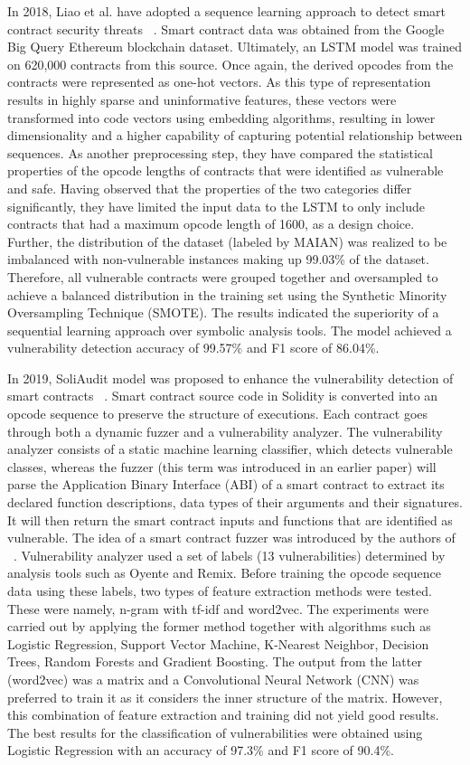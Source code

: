 In 2018, Liao et al. have adopted a sequence learning approach to detect smart contract security threats ~\cite{madmax}.
Smart contract data was obtained from the Google Big Query Ethereum blockchain dataset.
Ultimately, an LSTM model was trained on 620,000 contracts from this source. Once again, the derived opcodes from the contracts were represented as one-hot vectors.
As this type of representation results in highly sparse and uninformative features, these vectors were transformed into code vectors using embedding algorithms, resulting in lower dimensionality and a higher capability of capturing potential relationship between sequences.
As another preprocessing step, they have compared the statistical properties of the opcode lengths of contracts that were identified as vulnerable and safe.
Having observed that the properties of the two categories differ significantly, they have limited the input data to the LSTM to only include contracts that had a maximum opcode length of 1600, as a design choice.
Further, the distribution of the dataset (labeled by MAIAN) was realized to be imbalanced with non-vulnerable instances making up 99.03\% of the dataset.
Therefore, all vulnerable contracts were grouped together and oversampled to achieve a balanced distribution in the training set using the Synthetic Minority Oversampling Technique (SMOTE).
The results indicated the superiority of a sequential learning approach over symbolic analysis tools.
The model achieved a vulnerability detection accuracy of 99.57\% and F1 score of 86.04\%.

In 2019, SoliAudit model was proposed to enhance the vulnerability detection of smart contracts ~\cite{etehrTrust}.
Smart contract source code in Solidity is converted into an opcode sequence to preserve the structure of executions.
Each contract goes through both a dynamic fuzzer and a vulnerability analyzer.
The vulnerability analyzer consists of a static machine learning classifier, which detects vulnerable classes, whereas the fuzzer (this term was introduced in an earlier paper) will parse the Application Binary Interface (ABI) of a smart contract to extract its declared function descriptions, data types of their arguments and their signatures.
It will then return the smart contract inputs and functions that are identified as vulnerable.
The idea of a smart contract fuzzer was introduced by the authors of ~\cite{etehrTrust}.
Vulnerability analyzer used a set of labels (13 vulnerabilities) determined by analysis tools such as Oyente and Remix.
Before training the opcode sequence data using these labels, two types of feature extraction methods were tested. These were namely, n-gram with tf-idf and word2vec.
The experiments were carried out by applying the former method together with algorithms such as Logistic Regression, Support Vector Machine, K-Nearest Neighbor, Decision Trees, Random Forests and Gradient Boosting.
The output from the latter (word2vec) was a matrix and a Convolutional Neural Network (CNN) was preferred to train it as it considers the inner structure of the matrix.
However, this combination of feature extraction and training did not yield good results.
The best results for the classification of vulnerabilities were obtained using Logistic Regression with an accuracy of 97.3\% and F1 score of 90.4\%.

